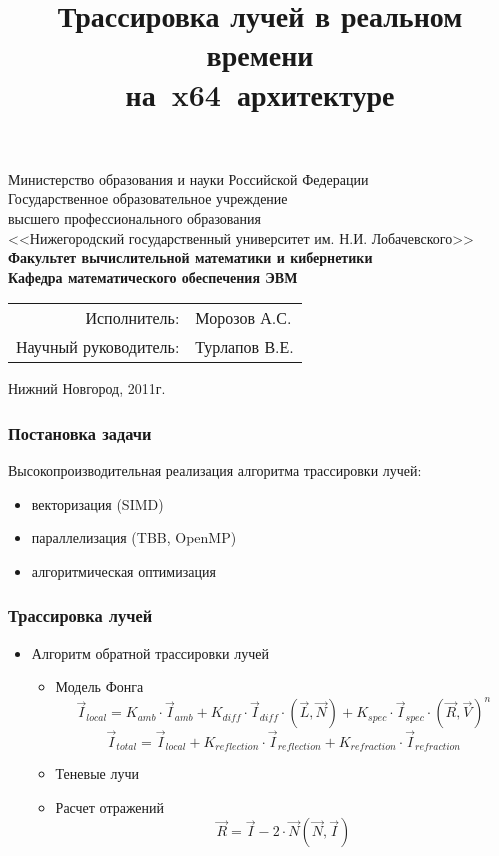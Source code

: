 \documentclass[utf8, 12pt]{beamer}
\title{Трассировка лучей в реальном времени \\ на~x64~архитектуре}
\author{}\date{}
\begin{document}
\begin{frame}
\begin{center}
{\tiny
Министерство образования и науки Российской Федерации\\ 
Государственное образовательное учреждение \\ 
высшего профессионального образования \\ 
<<Нижегородский государственный университет им. Н.И. Лобачевского>>\\
\bf{Факультет вычислительной математики и кибернетики \\
Кафедра математического обеспечения ЭВМ} \\
}
\end{center}
\titlepage
\vspace*{-1cm}
\begin{flushright}
\begin{tabular}{rl}
Исполнитель: & Морозов А.С. \\
Научный руководитель: & Турлапов В.Е.
\end{tabular}
\end{flushright}
\vspace*{1.75cm}
\begin{center}
\small Нижний Новгород, 2011г.
\end{center}
\end{frame}

\begin{frame}
\frametitle{Постановка задачи}
Высокопроизводительная реализация алгоритма трассировки лучей:
\begin{itemize}
\item векторизация (SIMD)
\item параллелизация (TBB, OpenMP)
\item алгоритмическая оптимизация
\end{itemize}
\end{frame}

\begin{frame}
\frametitle{Трассировка лучей}
\begin{itemize}
\item Алгоритм обратной трассировки лучей
\begin{itemize}
\item Модель Фонга
$$
 \vec{I}_{local} =  K_{amb} \cdot \vec{I}_{amb} +  K_{diff} \cdot \vec{I}_{diff} \cdot \left( \vec{L},\vec{N} \right) + K_{spec} \cdot \vec{I}_{spec} \cdot \left( \vec{R},\vec{V} \right)^n
$$
$$
 \vec{I}_{total} = \vec{I}_{local} + K_{reflection} \cdot \vec{I}_{reflection} + K_{refraction} \cdot \vec{I}_{refraction}
$$
\item Теневые лучи
\item Расчет отражений
$$
\vec{R} = \vec{I} - 2 \cdot \vec{N} (\vec{N} , \vec{I})
$$
\end{itemize}
\end{itemize}
\end{frame}
\end{document}
